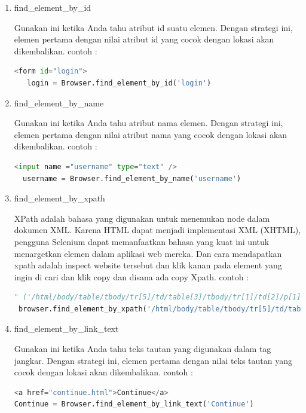 \begin{enumerate}
\item find\_element\_by\_id
\par Gunakan ini ketika Anda tahu atribut id suatu elemen. Dengan strategi ini, elemen pertama dengan nilai atribut id yang cocok dengan lokasi akan dikembalikan.
contoh :
\begin{lstlisting}[language=Python]
<form id="login">
   login = Browser.find_element_by_id('login')
\end{lstlisting}

\item find\_element\_by\_name
\par Gunakan ini ketika Anda tahu atribut nama elemen. Dengan strategi ini, elemen pertama dengan nilai atribut nama yang cocok dengan lokasi akan dikembalikan.
contoh :
\begin{lstlisting}[language=Python]
<input name ="username" type="text" />
  username = Browser.find_element_by_name('username')
\end{lstlisting}

\item find\_element\_by\_xpath
\par XPath adalah bahasa yang digunakan untuk menemukan node dalam dokumen XML. Karena HTML dapat menjadi implementasi XML (XHTML), pengguna Selenium dapat memanfaatkan bahasa yang kuat ini untuk menargetkan elemen dalam aplikasi web mereka. Dan cara mendapatkan xpath adalah inspect website tersebut dan klik kanan pada element yang ingin di cari dan klik copy dan disana ada copy Xpath.
contoh :
\begin{lstlisting}[language=Python]
" ('/html/body/table/tbody/tr[5]/td/table[3]/tbody/tr[1]/td[2]/p[1]/table/tbody/tr/td[3]/select').click()" 
 browser.find_element_by_xpath('/html/body/table/tbody/tr[5]/td/table[3]/tbody/tr[1]/td[2]/p[1]/table/tbody/tr/td[3]/select').click()
\end{lstlisting}

\item find\_element\_by\_link\_text
\par Gunakan ini ketika Anda tahu teks tautan yang digunakan dalam tag jangkar. Dengan strategi ini, elemen pertama dengan nilai teks tautan yang cocok dengan lokasi akan dikembalikan. 
contoh :
\begin{lstlisting}[language=Python]
<a href="continue.html">Continue</a>
Continue = Browser.find_element_by_link_text('Continue')
\end{lstlisting}


\end{enumerate}
